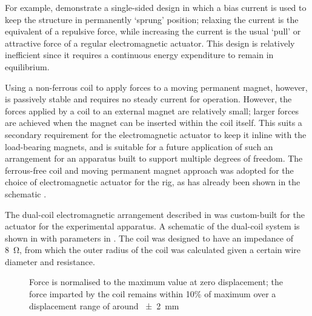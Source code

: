 \documentclass[11pt,a4paper]{memoir}
\begin{document}
For example, \textcite{nandi2009} demonstrate a single-sided design in which a
bias current is used to keep the structure in permanently `sprung' position;
relaxing the current is the equivalent of a repulsive force, while increasing
the current is the usual `pull' or attractive force of a regular
electromagnetic actuator. This design is relatively inefficient since it
requires a continuous energy expenditure to remain in equilibrium.

Using a non-ferrous coil to apply forces to a moving permanent magnet,
however, is passively stable and requires no steady current for operation.
However, the forces applied by a coil to an external magnet are relatively
small; larger forces are achieved when the magnet can be inserted within the
coil itself. This suits a secondary requirement for the electromagnetic
actuator to keep it inline with the load-bearing magnets, and is suitable for a
future application of such an arrangement for an apparatus built to support
multiple degrees of freedom. The ferrous-free coil and moving permanent magnet
approach was adopted for the choice of electromagnetic actuator for the rig,
as has already been shown in the schematic .

The dual-coil electromagnetic arrangement described in  was
custom-built for the actuator for the experimental apparatus. A schematic of
the dual-coil system is shown in  with parameters in
. The coil was designed to have an impedance of
\SI{8}{\ohm}, from which the outer radius of the coil was calculated given a
certain wire diameter and resistance.

\begin{figure}
  \begin{wide}
  \begin{sidefigure}
  \end{sidefigure}\hfil
  \begin{sidefigure}
  { Force is normalised to the maximum value at zero displacement; the force imparted by the coil remains within 10\% of maximum over a displacement range of around \SI{\pm2}{mm}}
\end{sidefigure}
  \end{wide}
\end{figure}
\end{document}
